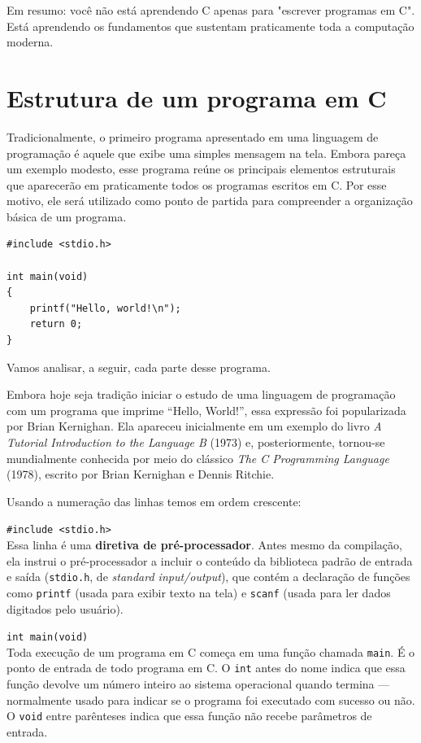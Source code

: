 \documentclass[12pt,a4paper,oneside]{extreport}
\begin{document}
Em resumo: você não está aprendendo C apenas para "escrever programas em C". Está aprendendo os fundamentos que sustentam praticamente toda a computação moderna.


\section{Estrutura de um programa em C}
\label{sec:estrutura-programa}

Tradicionalmente, o primeiro programa apresentado em uma linguagem de programação é aquele que exibe uma simples mensagem na tela. Embora pareça um exemplo modesto, esse programa reúne os principais elementos estruturais que aparecerão em praticamente todos os programas escritos em C. Por esse motivo, ele será utilizado como ponto de partida para compreender a organização básica de um programa.

\begin{lstlisting}
#include <stdio.h>

int main(void)
{
    printf("Hello, world!\n");
    return 0;
}
\end{lstlisting}

Vamos analisar, a seguir, cada parte desse programa.

\begin{curiosidade}

Embora hoje seja tradição iniciar o estudo de uma linguagem de programação
com um programa que imprime ``Hello, World!'', essa expressão foi
popularizada por Brian Kernighan. Ela apareceu inicialmente em um exemplo do
livro \textit{A Tutorial Introduction to the Language B} (1973) e,
posteriormente, tornou-se mundialmente conhecida por meio do clássico
\textit{The C Programming Language} (1978), escrito por Brian Kernighan e
Dennis Ritchie.

\end{curiosidade}

Usando a numeração das linhas temos em ordem crescente:

\texttt{\#include <stdio.h>} \\
Essa linha é uma \textbf{diretiva de pré-processador}. Antes mesmo da compilação, ela instrui o pré-processador a incluir o conteúdo da biblioteca padrão de entrada e saída (\texttt{stdio.h}, de \textit{standard input/output}), que contém a declaração de funções como \texttt{printf} (usada para exibir texto na tela) e \texttt{scanf} (usada para ler dados digitados pelo usuário).

\texttt{int main(void)} \\
Toda execução de um programa em C começa em uma função chamada \texttt{main}. É o ponto de entrada de todo programa em C. O \texttt{int} antes do nome indica que essa função devolve um número inteiro ao sistema operacional quando termina — normalmente usado para indicar se o programa foi executado com sucesso ou não. O \texttt{void} entre parênteses indica que essa função não recebe parâmetros de entrada.
\end{document}
